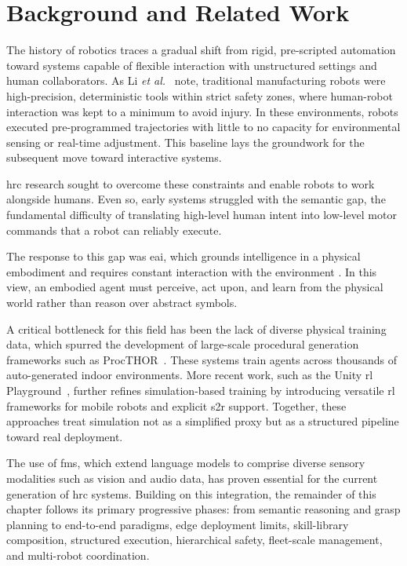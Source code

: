 \documentclass[
     12pt,
     a4paper,
     BCOR=10mm,
     DIV=14,
     listof=totoc,
     bibliography=totoc,
     parskip,
     twoside,
     headsepline
     ]{scrreprt}
\begin{document}
\chapter{Background and Related Work}\label{background}
The history of robotics traces a gradual shift from rigid, pre-scripted automation toward systems capable of flexible interaction with unstructured settings and human collaborators. As Li \emph{et al.}~\cite{Li2020} note, traditional manufacturing robots were high-precision, deterministic tools within strict safety zones, where human-robot interaction was kept to a minimum to avoid injury. In these environments, robots executed pre-programmed trajectories with little to no capacity for environmental sensing or real-time adjustment. This baseline lays the groundwork for the subsequent move toward interactive systems.

\gls{hrc} research sought to overcome these constraints and enable robots to work alongside humans. Even so, early systems struggled with the semantic gap, the fundamental difficulty of translating high-level human intent into low-level motor commands that a robot can reliably execute.

The response to this gap was \gls{eai}, which grounds intelligence in a physical embodiment and requires constant interaction with the environment \cite{Li2026}. In this view, an embodied agent must perceive, act upon, and learn from the physical world rather than reason over abstract symbols.

A critical bottleneck for this field has been the lack of diverse physical training data, which spurred the development of large-scale procedural generation frameworks such as ProcTHOR~\cite{deitke2022procthorlargescaleembodiedai}. These systems train agents across thousands of auto-generated indoor environments. More recent work, such as the Unity \gls{rl} Playground~\cite{ye2025unityrlplaygroundversatile}, further refines simulation-based training by introducing versatile \gls{rl} frameworks for mobile robots and explicit \gls{s2r} support. Together, these approaches treat simulation not as a simplified proxy but as a structured pipeline toward real deployment.

The use of \gls{fm}s, which extend language models to comprise diverse sensory modalities such as vision and audio data, has proven essential for the current generation of \gls{hrc} systems. Building on this integration, the remainder of this chapter follows its primary progressive phases: from semantic reasoning and grasp planning to end-to-end paradigms, edge deployment limits, skill-library composition, structured execution, hierarchical safety, fleet-scale management, and multi-robot coordination.
\end{document}
